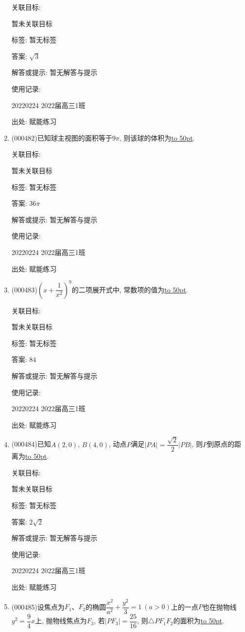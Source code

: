 \documentclass[10pt,a4paper]{article}
\newcommand{\blank}[1]{\underline{\hbox to #1pt{}}}
\begin{document}
\begin{enumerate}[1.]
关联目标:

暂未关联目标



标签: 暂无标签

答案: $\sqrt 3$

解答或提示: 暂无解答与提示

使用记录:

20220224	2022届高三1班	


出处: 赋能练习
\item { (000482)}已知球主视图的面积等于$9\pi$, 则该球的体积为\blank{50}.


关联目标:

暂未关联目标



标签: 暂无标签

答案: $36\pi$

解答或提示: 暂无解答与提示

使用记录:

20220224	2022届高三1班	


出处: 赋能练习
\item { (000483)}$(x+\dfrac{1}{x^2})^9$的二项展开式中, 常数项的值为\blank{50}.


关联目标:

暂未关联目标



标签: 暂无标签

答案: $84$

解答或提示: 暂无解答与提示

使用记录:

20220224	2022届高三1班	


出处: 赋能练习
\item { (000484)}已知$A(2,0)$, $B(4,0)$, 动点$P$满足$|PA|=\dfrac{\sqrt2} 2|PB|$, 则$P$到原点的距离为\blank{50}.


关联目标:

暂未关联目标



标签: 暂无标签

答案: $2\sqrt 2$

解答或提示: 暂无解答与提示

使用记录:

20220224	2022届高三1班	


出处: 赋能练习
\item { (000485)}设焦点为$F_1$、$F_2$的椭圆$\dfrac{x^2}{a^2}+\dfrac{y^2}3=1 \ (a>0)$上的一点$P$也在抛物线$y^2=\dfrac94x$上, 抛物线焦点为$F_3$, 若$|PF_3|=\dfrac{25}{16}$, 则$\triangle PF_1F_2$的面积为\blank{50}.



\end{enumerate}
\end{document}
